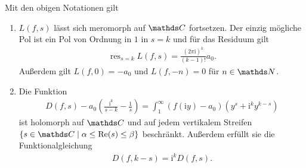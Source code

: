 \begin{thm}
Mit den obigen Notationen gilt
\begin{enumerate}
\item $L(f,s)$ lässt sich meromorph auf $\C$ fortsetzen.
Der einzig mögliche Pol ist ein Pol von Ordnung in $1$ in $s=k$ und für das Residuum gilt
\begin{align*}
\operatorname{res}_{s=k} L(f,s)=\frac{(2\pi \mathrm{i})^k}{(k-1)!} a_0.
\end{align*}
Außerdem gilt $L(f,0)=-a_0$ und $L(f,-n)=0$ für $n\in \N$.
\item Die Funktion
\begin{align*}
D(f,s)-a_0\left(\frac{\mathrm{i}^k}{s-k}-\frac{1}{s}\right)=\int_1^\infty (f(\mathrm{i}y)-a_0)\left(y^s+\mathrm{i}^ky^{k-s}\right)
\end{align*}
ist holomorph auf $\C$ und auf jedem vertikalem Streifen $\{s \in \C \mid \alpha \leq \Ret(s)\leq \beta\}$ beschränkt.
Außerdem erfüllt sie die Funktionalgleichung
\begin{align*}
D(f,k-s)=\mathrm{i}^k D(f,s).
\end{align*}
\end{enumerate}
\end{thm}

